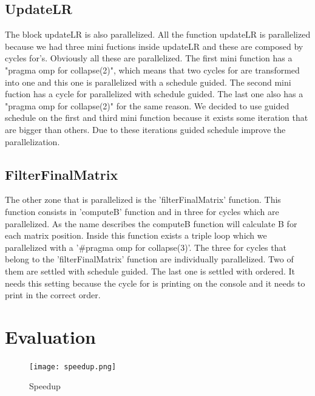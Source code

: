 \documentclass[twocolumn]{article}
\begin{document}
    \subsection{UpdateLR}\label{subsec:updatelr2}
    The block updateLR is also parallelized.
    All the function updateLR is parallelized because we had three mini fuctions inside updateLR and these are composed by cycles for's.
    Obviously all these are parallelized.
    The first mini function has a "pragma omp for collapse(2)", which means that two cycles for are transformed into one and this one is parallelized with a schedule guided.
    The second mini fuction has a cycle for parallelized with schedule guided.
    The last one also has a "pragma omp for collapse(2)" for the same reason.
    We decided to use guided schedule on the first and third mini function because it exists some iteration that are bigger than others.
    Due to these iterations guided schedule improve the parallelization.

    \subsection{FilterFinalMatrix}\label{subsec:filterfinalmatrix}
    The other zone that is parallelized is the 'filterFinalMatrix' function.
    This function consists in 'computeB' function and in three for cycles which are parallelized.
    As the name describes the computeB function will calculate B for each matrix position.
    Inside this function exists a triple loop which we parallelized with a '#pragma omp for collapse(3)'. The three for cycles that belong to the 'filterFinalMatrix' function are individually parallelized.
    Two of them are settled with schedule guided.
    The last one is settled with ordered.
    It needs this setting because the cycle for is printing on the console and it needs to print in the correct order.

    \section{Evaluation}\label{sec:evaluation}

    \begin{figure}[h]
        \caption{Speedup}
        \texttt{[image: speedup.png]}
        \label{fig:Ng2}
    \end{figure}
\end{document}
